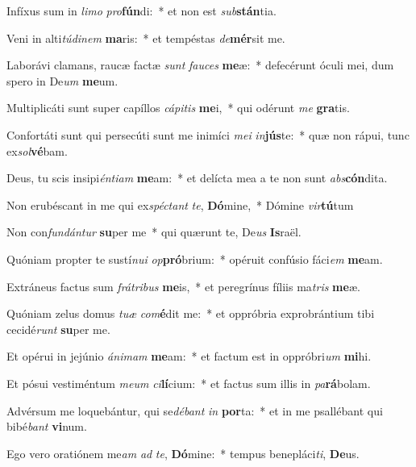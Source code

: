 \item Infíxus sum in \textit{li}\textit{mo} \textit{pro}\textbf{fún}di:~* et non est \textit{sub}\textbf{stán}tia.
\item Veni in alti\textit{tú}\textit{di}\textit{nem} \textbf{ma}ris:~* et tempéstas \textit{de}\textbf{mér}sit me.
\item Laborávi clamans, raucæ factæ \textit{sunt} \textit{fau}\textit{ces} \textbf{me}æ:~* defecérunt óculi mei, dum spero in De\textit{um} \textbf{me}um.
\item Multiplicáti sunt super capíllos \textit{cá}\textit{pi}\textit{tis} \textbf{me}i,~* qui odérunt \textit{me} \textbf{gra}tis.
\item Confortáti sunt qui persecúti sunt me inimíci \textit{me}\textit{i} \textit{in}\textbf{jús}te:~* quæ non rápui, tunc ex\textit{sol}\textbf{vé}bam.
\item Deus, tu scis insipi\textit{én}\textit{ti}\textit{am} \textbf{me}am:~* et delícta mea a te non sunt \textit{abs}\textbf{cón}dita.
\item Non erubéscant in me qui ex\textit{spéc}\textit{tant} \textit{te}, \textbf{Dó}mine,~* Dómine \textit{vir}\textbf{tú}tum
\item Non con\textit{fun}\textit{dán}\textit{tur} \textbf{su}per me~* qui quærunt te, De\textit{us} \textbf{Is}raël.
\item Quóniam propter te sustí\textit{nu}\textit{i} \textit{op}\textbf{pró}brium:~* opéruit confúsio fáci\textit{em} \textbf{me}am.
\item Extráneus factus sum \textit{frá}\textit{tri}\textit{bus} \textbf{me}is,~* et peregrínus fíliis ma\textit{tris} \textbf{me}æ.
\item Quóniam zelus domus \textit{tu}\textit{æ} \textit{com}\textbf{é}dit me:~* et oppróbria exprobrántium tibi cecidé\textit{runt} \textbf{su}per me.
\item Et opérui in jejúnio \textit{á}\textit{ni}\textit{mam} \textbf{me}am:~* et factum est in oppróbri\textit{um} \textbf{mi}hi.
\item Et pósui vestiméntum \textit{me}\textit{um} \textit{ci}\textbf{lí}cium:~* et factus sum illis in \textit{pa}\textbf{rá}bolam.
\item Advérsum me loquebántur, qui se\textit{dé}\textit{bant} \textit{in} \textbf{por}ta:~* et in me psallébant qui bibé\textit{bant} \textbf{vi}num.
\item Ego vero oratiónem me\textit{am} \textit{ad} \textit{te}, \textbf{Dó}mine:~* tempus benepláci\textit{ti}, \textbf{De}us.
